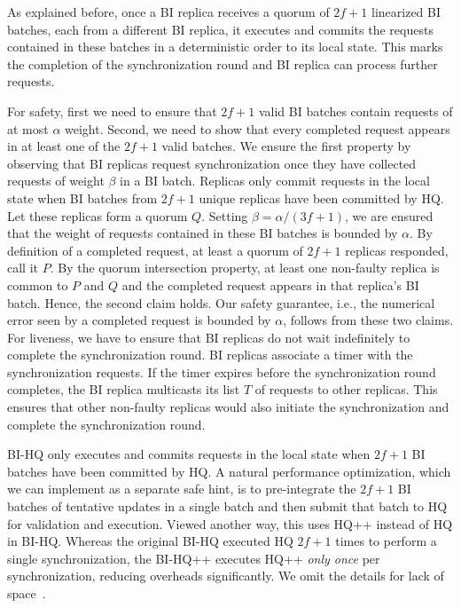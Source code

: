 \documentclass[twocolumn,10pt]{article}
\begin{document}
As explained before, once a BI replica receives a quorum of $2f+1$
linearized BI batches, each
from a different BI replica, it executes
and commits the requests contained in these batches in a deterministic
order to its
local state.
This marks the completion of the synchronization
round and BI replica can process further requests.




 For safety, first we need to ensure that $2f+1$
valid BI batches contain requests of at most $\alpha$ weight. Second, we 
need to show that every completed request appears in at least one of the $2f+1$
valid batches. We ensure the first property by observing
that BI replicas request synchronization
once they have collected requests of weight $\beta$ in a BI batch.  Replicas
only commit requests in the local state when BI batches from $2f+1$ unique replicas 
have been committed by HQ. Let these replicas form a quorum $Q$.  Setting
$\beta=\alpha/(3f+1)$, we are ensured that the weight of requests
contained in these BI batches is bounded by $\alpha$. 
By definition of a
completed request, at least a quorum of $2f+1$ replicas responded,
call it $P$. By the quorum intersection property, at least one
non-faulty replica is common to $P$ and $Q$ and the completed request
appears in that replica's BI batch. Hence, the second claim holds. Our safety
guarantee, i.e., the numerical error seen by a completed request is bounded by $\alpha$, 
follows from these two claims.
For liveness, we have to ensure that BI replicas do not wait indefinitely
to complete the synchronization round. 
BI replicas associate a timer with the synchronization requests. If the timer expires
before the synchronization round completes, the BI replica multicasts its list $T$ of 
requests to other replicas. This ensures that other non-faulty replicas would also initiate
the synchronization and complete the synchronization round.

 BI-HQ only executes and commits requests in
the local state when $2f+1$ BI batches 
have been committed by HQ. A natural performance optimization, which
we can implement as a separate safe hint, is to pre-integrate the
$2f+1$ BI batches of tentative updates in a single batch and then submit
that batch to HQ for validation and execution.  Viewed another way,
this uses HQ++ instead of HQ in BI-HQ. Whereas the original BI-HQ executed HQ $2f+1$ times to
perform a single synchronization, the BI-HQ++ executes HQ++
\emph{only once} per synchronization, reducing overheads
significantly.  We omit the details  for lack of
space~\cite{hq++:website}.
\end{document}
